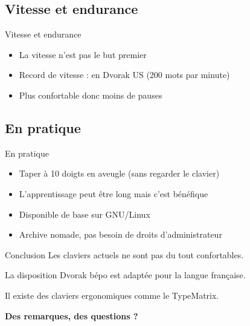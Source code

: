 \documentclass{beamer}
\begin{document}
\subsection{Vitesse et endurance}
\begin{frame}{Vitesse et endurance}
\begin{itemize}
  \item La vitesse n'est pas le but premier
  \item Record de vitesse : en Dvorak US (200 mots par minute)
  \item Plus confortable donc moins de pauses
\end{itemize}
\end{frame}

\subsection{En pratique}
\begin{frame}{En pratique}
\begin{itemize}
  \item Taper à 10 doigts en aveugle (sans regarder le clavier)
  \item L'apprentissage peut être long mais c'est bénéfique
  \item Disponible de base sur GNU/Linux
  \item Archive nomade, pas besoin de droits d'administrateur
\end{itemize}
\end{frame}

\begin{frame}{Conclusion}
Les claviers actuels ne sont pas du tout confortables.

La disposition Dvorak bépo est adaptée pour la langue française.

Il existe des claviers ergonomiques comme le TypeMatrix.

\begin{center}
  \textbf{{\Large Des remarques, des questions ?}}
\end{center}
\end{frame}
\end{document}
